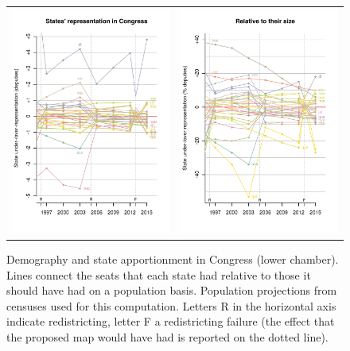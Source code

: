 \documentclass[letter,12pt]{article}
\begin{document}
\begin{figure}
\begin{center}
  \begin{tabular}{cc}
    \includegraphics[width=.45\columnwidth]{statesUnderOverRep.pdf} & 
    \includegraphics[width=.45\columnwidth]{statesUnderOverRep-rel.pdf} \\ 
  \end{tabular}
  \caption{Demography and state apportionment in Congress (lower chamber). Lines connect the seats that each state had relative to those it should have had on a population basis. Population projections from censuses used for this computation. Letters R in the horizontal axis indicate redistricting, letter F a redistricting failure (the effect that the proposed map would have had is reported on the dotted line).}\label{F:underOverRep}
\end{center}
\end{figure}
\end{document}
